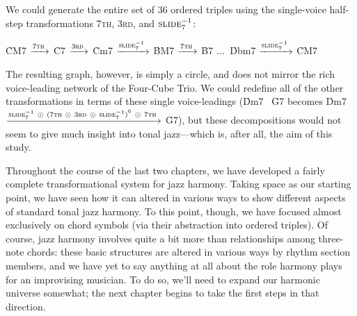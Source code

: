 We could generate the entire set of 36 ordered triples
using the single-voice half-step transformations \textsc{7th}, \textsc{3rd},
and $\text{\textsc{slide}}_7^{-1}$:%
%
\begin{center}
  \h{CM7} $\xrightarrow{\text{7\textsc{th}}\,}$
  \h{C7}  $\xrightarrow{\text{3\textsc{rd}}\,}$
  \h{Cm7} $\xrightarrow{\text{\textsc{slide}}_7^{-1}\,}$
  \h{BM7} $\xrightarrow{\text{7\textsc{th}}\,}$
  \h{B7}  $\ldots\ $
  \h{Dbm7} $\xrightarrow{\text{\textsc{slide}}_7^{-1}\,}$
  \h{CM7}
\end{center}%
%
The resulting graph, however, is simply a circle, and does not mirror the rich
voice-leading network of the Four-Cube Trio. We could redefine all of the
other transformations in terms of these single voice-leadings (\h{Dm7}
\TFarrow\ \h{G7} becomes \h{Dm7}
$\xrightarrow{\text{\textsc{slide}}_7^{-1}\ \odot\ {(\text{7\textsc{th}}\ \odot\
  \text{3\textsc{rd}}\ \odot\ \text{\textsc{slide}}_7^{-1})}^6\ \odot\
  7\text{\textsc{th}}\,}$
\h{G7}), but these decompositions would not seem to give much insight into
tonal jazz---which is, after all, the aim of this study.

Throughout the course of the last two chapters, we have developed a fairly
complete transformational system for jazz harmony. Taking \tf space as our
starting point, we have seen how it can altered in various ways to show
different aspects of standard tonal jazz harmony. To this point, though, we
have focused almost exclusively on chord symbols (via their abstraction into
ordered triples). Of course, jazz harmony involves quite a bit more than
relationships among three-note chords: these basic structures are altered in
various ways by rhythm section members, and we have yet to say anything at all
about the role harmony plays for an improvising musician. To do so, we'll need
to expand our harmonic universe somewhat; the next chapter begins to take the
first steps in that direction.

